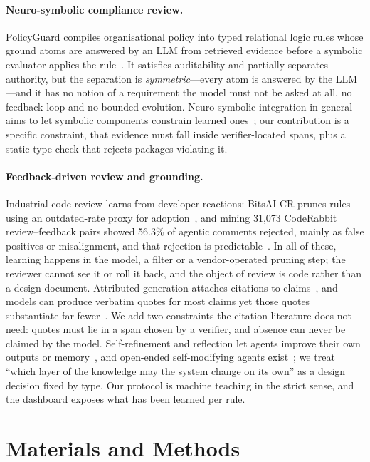 \documentclass{IOS-Book-Article}
\begin{document}
\paragraph{Neuro-symbolic compliance review.}
PolicyGuard compiles organisational policy into typed relational logic rules whose ground atoms are answered by an LLM from retrieved evidence before a symbolic evaluator applies the rule~\cite{malik2026}. It satisfies auditability and partially separates authority, but the separation is \emph{symmetric}---every atom is answered by the LLM---and it has no notion of a requirement the model must not be asked at all, no feedback loop and no bounded evolution. Neuro-symbolic integration in general aims to let symbolic components constrain learned ones~\cite{garcez2023}; our contribution is a specific constraint, that evidence must fall inside verifier-located spans, plus a static type check that rejects packages violating it.

\paragraph{Feedback-driven review and grounding.}
Industrial code review learns from developer reactions: BitsAI-CR prunes rules using an outdated-rate proxy for adoption~\cite{sun2025}, and mining 31{,}073 CodeRabbit review--feedback pairs showed 56.3\% of agentic comments rejected, mainly as false positives or misalignment, and that rejection is predictable~\cite{lin2026}. In all of these, learning happens in the model, a filter or a vendor-operated pruning step; the reviewer cannot see it or roll it back, and the object of review is code rather than a design document. Attributed generation attaches citations to claims~\cite{gao2023}, and models can produce verbatim quotes for most claims yet those quotes substantiate far fewer~\cite{zhang2026cite}. We add two constraints the citation literature does not need: quotes must lie in a span chosen by a verifier, and absence can never be claimed by the model. Self-refinement and reflection let agents improve their own outputs or memory~\cite{madaan2023,shinn2023}, and open-ended self-modifying agents exist~\cite{zhang2025dgm}; we treat ``which layer of the knowledge may the system change on its own'' as a design decision fixed by type. Our protocol is machine teaching in the strict sense, and the dashboard exposes what has been learned per rule.

\section{Materials and Methods}
\end{document}
